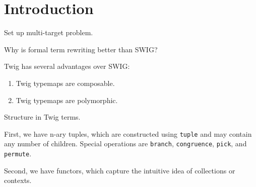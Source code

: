 
\section{Introduction}

Set up multi-target problem.

Why is formal term rewriting better than SWIG?

Twig has several advantages over SWIG:

\begin{enumerate}
\item Twig typemaps are composable.
\item Twig typemaps are polymorphic.
\end{enumerate}

Structure in Twig terms.

First, we have n-ary tuples, which are constructed using \texttt{tuple} and may
contain any number of children. Special operations are \texttt{branch},
\texttt{congruence}, \texttt{pick}, and \texttt{permute}.

Second, we have functors, which capture the intuitive idea of collections or
contexts.

% 
%     
